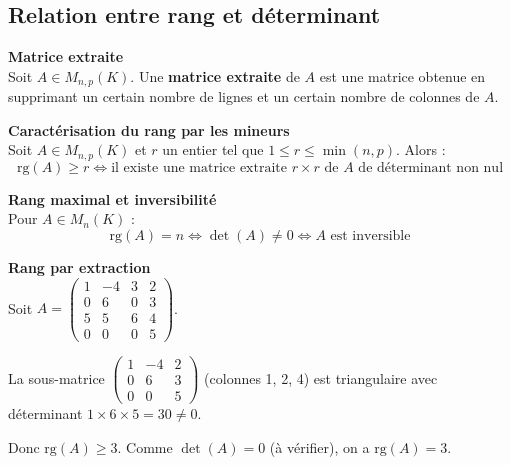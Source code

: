 \documentclass[../PolyS4.tex]{subfiles}
\begin{document}
\newpage

\subsection{Relation entre rang et déterminant}

\begin{Def}\textbf{Matrice extraite}\\

Soit $A \in M_{n,p}(K)$. Une \textbf{matrice extraite} de $A$ est une matrice obtenue en supprimant un certain nombre de lignes et un certain nombre de colonnes de $A$.
\end{Def}

\begin{Thm}\textbf{Caractérisation du rang par les mineurs}\\

Soit $A \in M_{n,p}(K)$ et $r$ un entier tel que $1 \leq r \leq \min(n, p)$. Alors :
$$\text{rg}(A) \geq r \Longleftrightarrow \text{il existe une matrice extraite } r \times r \text{ de } A \text{ de déterminant non nul}$$
\end{Thm}

\begin{Prop}\textbf{Rang maximal et inversibilité}\\

Pour $A \in M_n(K)$ :
$$\text{rg}(A) = n \Longleftrightarrow \det(A) \neq 0 \Longleftrightarrow A \text{ est inversible}$$
\end{Prop}

\begin{Ex}\textbf{Rang par extraction}\\

Soit $A = \begin{pmatrix} 1 & -4 & 3 & 2 \\ 0 & 6 & 0 & 3 \\ 5 & 5 & 6 & 4 \\ 0 & 0 & 0 & 5 \end{pmatrix}$.

La sous-matrice $\begin{pmatrix} 1 & -4 & 2 \\ 0 & 6 & 3 \\ 0 & 0 & 5 \end{pmatrix}$ (colonnes 1, 2, 4) est triangulaire avec déterminant $1 \times 6 \times 5 = 30 \neq 0$.

Donc $\text{rg}(A) \geq 3$. Comme $\det(A) = 0$ (à vérifier), on a $\text{rg}(A) = 3$.
\end{Ex}
\end{document}
